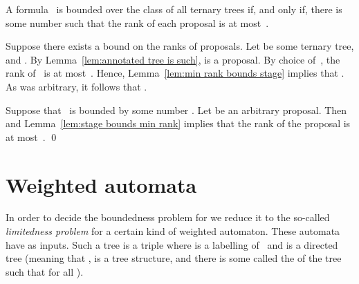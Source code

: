 \documentclass{LMCS}
\begin{document}
\begin{prop}\label{prop: boundeness and ranks}
A formula~ is bounded over the class of all ternary trees
if, and only if, there is some number 
such that the rank of each proposal is at most~.
\end{prop}

\proof
 Suppose there exists a bound  on the ranks of proposals.
Let  be some ternary tree, and .
By Lemma~\ref{lem:annotated tree is such},
 is a proposal.
By choice of~, the rank of~ is at most~.
Hence, Lemma~\ref{lem:min rank bounds stage} implies that .
As  was arbitrary, it follows that .

 Suppose that ~is bounded by some number .
Let  be an arbitrary proposal.
Then 
and Lemma~\ref{lem:stage bounds min rank} implies
that the rank of the proposal is at most~.
\qed


\section{Weighted automata}
\label{sect:automata}
\label{sect:end I}

In order to decide the boundedness problem for 
we reduce it to the so-called \emph{limitedness problem}
for a certain kind of weighted automaton.
These automata have  as inputs.
Such a tree is a triple 
where  is a labelling of~
and  is a directed tree
(meaning that ,
 is a tree structure,
and there is some  called the  of the tree
such that  for all ).
\end{document}
